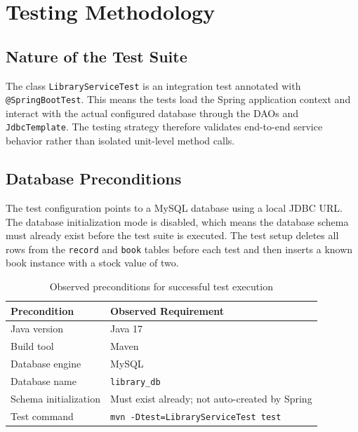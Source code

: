 \documentclass[12pt,a4paper]{report}
\begin{document}
\chapter{Testing Methodology}

\section{Nature of the Test Suite}
The class \texttt{LibraryServiceTest} is an integration test annotated with \texttt{@SpringBootTest}. This means the tests load the Spring application context and interact with the actual configured database through the DAOs and \texttt{JdbcTemplate}. The testing strategy therefore validates end-to-end service behavior rather than isolated unit-level method calls.

\section{Database Preconditions}
The test configuration points to a MySQL database using a local JDBC URL. The database initialization mode is disabled, which means the database schema must already exist before the test suite is executed. The test setup deletes all rows from the \texttt{record} and \texttt{book} tables before each test and then inserts a known book instance with a stock value of two.

\begin{table}[H]
    \centering
    \caption{Observed preconditions for successful test execution}
    \begin{tabular}{p{5cm} p{7.5cm}}
        \toprule
        \textbf{Precondition} & \textbf{Observed Requirement} \\
        \midrule
        Java version & Java 17 \\
        Build tool & Maven \\
        Database engine & MySQL \\
        Database name & \texttt{library\_db} \\
        Schema initialization & Must exist already; not auto-created by Spring \\
        Test command & \texttt{mvn -Dtest=LibraryServiceTest test} \\
        \bottomrule
    \end{tabular}
\end{table}
\end{document}
